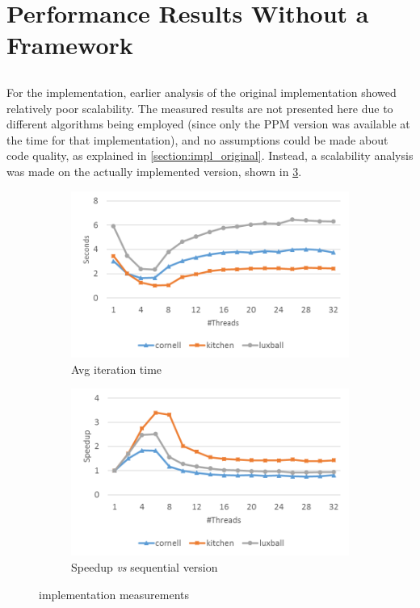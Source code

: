 \documentclass[main.tex]{subfiles}
\begin{document}
\section{Performance Results Without a Framework} \label{sec:prof:cpu}

\subsection{\cpu}

For the \cpu implementation, earlier analysis of the original implementation showed relatively poor scalability. The measured results are not presented here due to different algorithms being employed (since only the PPM version was available at the time for that implementation), and no assumptions could be made about code quality, as explained in \cref{section:impl_original}.
Instead, a scalability analysis was made on the actually implemented \cpu version, shown in \cref{fig:prof:cpu}.

\begin{figure}[!htp]
  \centering
  \begin{subfigure}{.5\textwidth}
    \centering
    \includegraphics[width=\linewidth]{profiling/cpu_time}
    \caption{Avg iteration time \label{fig:prof:cpu_time}}
  \end{subfigure}%
  \begin{subfigure}{.5\textwidth}
    \centering
    \includegraphics[width=\linewidth]{profiling/cpu_speedup}
    \caption{Speedup \textit{vs} sequential version \label{fig:prof:cpu_speedup}}
  \end{subfigure}
  \caption{\cpu implementation measurements \label{fig:prof:cpu}}
\end{figure}
\end{document}
